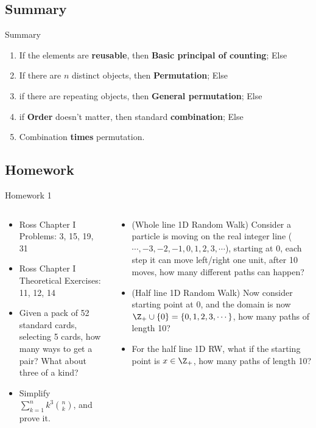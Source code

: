 \subsection{Summary}
\begin{frame}{Summary}
\begin{enumerate}
    \item If the elements are \textbf{reusable}, then \textbf{Basic principal of counting}; Else
    \item If there are $n$ distinct objects, then \textbf{Permutation}; Else
    \item if there are repeating objects, then \textbf{General permutation}; Else
    \item if \textbf{Order} doesn't matter, then standard \textbf{combination}; Else
    \item Combination \textbf{times} permutation.
\end{enumerate}
    
\end{frame}

\subsection{Homework}
\begin{frame}{Homework 1 }
	\begin{columns}
		\begin{column}{0.5\textwidth}
			\begin{itemize}
				\item Ross Chapter I Problems: 3, 15, 19, 31
				\item Ross Chapter I Theoretical Exercises: 11, 12, 14 
				\item Given a pack of 52 standard cards, selecting 5 cards, how many ways to get a pair? What about three of a kind?
				\item Simplify $\sum_{k=1}^n k^3\binom{n}{k}$, and prove it. 
			\end{itemize}
		\end{column}
	\begin{column}{0.5\textwidth}
		\begin{itemize}
			
			\item (Whole line 1D Random Walk) Consider a particle is moving on the real integer line ($\cdots,-3,-2,-1,0,1,2,3,\cdots$), starting at 0, each step it can move left/right one unit, after 10 moves, how many different paths can happen? 
			\item (Half line 1D Random Walk) Now consider starting point at 0, and the domain is now $\Z_+\cup \{0\}=\{0,1,2,3,\cdots\}$, how many paths of length 10?
			\item For the half line 1D RW, what if the starting point is $x\in \Z_+$, how many paths of length 10?
		\end{itemize}
	\end{column}
	\end{columns}
\end{frame}
